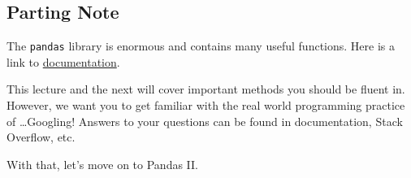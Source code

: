 \documentclass[
  letterpaper,
  DIV=11,
  numbers=noendperiod]{scrreprt}
\begin{document}
\hypertarget{parting-note}{%
\subsection{Parting Note}\label{parting-note}}

The \texttt{pandas} library is enormous and contains many useful
functions. Here is a link to
\href{https://pandas.pydata.org/docs/}{documentation}.

This lecture and the next will cover important methods you should be
fluent in. However, we want you to get familiar with the real world
programming practice of \ldots Googling! Answers to your questions can
be found in documentation, Stack Overflow, etc.

With that, let's move on to Pandas II.
\end{document}
